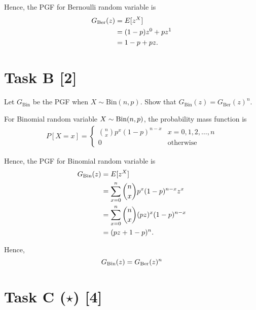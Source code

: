 Hence, the PGF for Bernoulli random variable is
\begin{equation}
    \begin{aligned}
        G_{\text{Ber}}(z) &= E[z^X] \\
        &= (1-p)z^0 + pz^1 \\
        &= 1-p + pz.
    \end{aligned}
    \label{e1.2}
\end{equation}


\section*{\colS{$\S$} Task B \hfill \normalfont \large [2]}

\begin{tcolorbox}
    Let $G_\text{Bin}$ be the PGF when $X \sim \text{Bin}(n, p)$. Show that
    $G_\text{Bin}(z) = G_\text{Ber}(z)^n$.
\end{tcolorbox}


For Binomial random variable $X\sim\text{Bin}(n, p)$, the probability mass function is
\begin{equation}
    \begin{aligned}
        P[X=x] = \begin{cases}
            \binom{n}{x}p^x(1-p)^{n-x} & x=0, 1, 2, \ldots, n \\
            0 & \text{otherwise}
        \end{cases}
    \end{aligned}
    \label{e1.3}
\end{equation}

Hence, the PGF for Binomial random variable is
\begin{equation}
    \begin{aligned}
        G_{\text{Bin}}(z) &= E[z^X] \\
        &= \sum_{x=0}^{n} \binom{n}{x}p^x(1-p)^{n-x}z^x \\
        &= \sum_{x=0}^{n} \binom{n}{x}(pz)^x(1-p)^{n-x} \\
        &= (pz + 1 - p)^n.
    \end{aligned}
    \label{e1.4}
\end{equation}

Hence,
\begin{equation}
    G_{\text{Bin}}(z) = G_{\text{Ber}}(z)^n
    \label{e1.5}
\end{equation}


\section*{\colS{$\S$} Task C ($\star$) \hfill \normalfont \large [4]}

